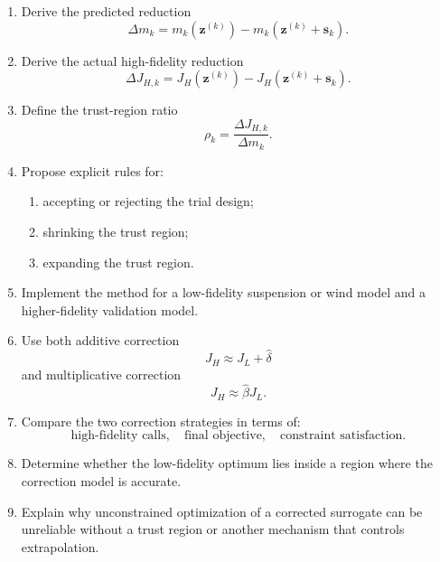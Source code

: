 \begin{enumerate}
    \item Derive the predicted reduction
    \begin{equation}
    \Delta m_k
    =
    m_k(\mathbf{z}^{(k)})
    -
    m_k(\mathbf{z}^{(k)}+\mathbf{s}_k).
    \end{equation}

    \item Derive the actual high-fidelity reduction
    \begin{equation}
    \Delta J_{H,k}
    =
    J_H(\mathbf{z}^{(k)})
    -
    J_H(\mathbf{z}^{(k)}+\mathbf{s}_k).
    \end{equation}

    \item Define the trust-region ratio
    \begin{equation}
    \rho_k
    =
    \frac{\Delta J_{H,k}}
    {\Delta m_k}.
    \end{equation}

    \item Propose explicit rules for:
    \begin{enumerate}
        \item accepting or rejecting the trial design;
        \item shrinking the trust region;
        \item expanding the trust region.
    \end{enumerate}

    \item Implement the method for a low-fidelity suspension or wind model
    and a higher-fidelity validation model.

    \item Use both additive correction
    \begin{equation}
    J_H\approx J_L+\widehat{\delta}
    \end{equation}
    and multiplicative correction
    \begin{equation}
    J_H\approx\widehat{\beta}J_L.
    \end{equation}

    \item Compare the two correction strategies in terms of:
    \begin{equation}
    \text{high-fidelity calls},
    \quad
    \text{final objective},
    \quad
    \text{constraint satisfaction}.
    \end{equation}

    \item Determine whether the low-fidelity optimum lies inside a region
    where the correction model is accurate.

    \item Explain why unconstrained optimization of a corrected surrogate can
    be unreliable without a trust region or another mechanism that controls
    extrapolation.
\end{enumerate}


